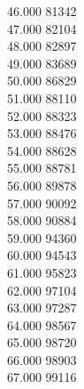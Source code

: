 { 46.000	81342 \\
 47.000	82104 \\
 48.000	82897 \\
 49.000	83689 \\
 50.000	86829 \\
 51.000	88110 \\
 52.000	88323 \\
 53.000	88476 \\
 54.000	88628 \\
 55.000	88781 \\
 56.000	89878 \\
 57.000	90092 \\
 58.000	90884 \\
 59.000	94360 \\
 60.000	94543 \\
 61.000	95823 \\
 62.000	97104 \\
 63.000	97287 \\
 64.000	98567 \\
 65.000	98720 \\
 66.000	98903 \\
 67.000	99116 \\
}
